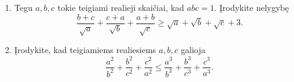 \begin{enumerate}
  \item {} Tegu $a, b,
    c$ tokie teigiami realieji skaičiai, kad $abc=1$. Įrodykite nelygybę
    $$\frac{b+c}{\sqrt{a}}+\frac{c+a}{\sqrt{b}}+\frac{a+b}{\sqrt{c}}\geq\sqrt{a}+\sqrt{b}+\sqrt{c}+3.$$
  \item Įrodykite, kad teigiamiems realiesiems $a,b,c$ galioja
    $$\frac{a^2}{b^2}+\frac{b^2}{c^2}+\frac{c^2}{a^2}\leq\frac{a^3}{b^3}+\frac{b^3}{c^3}+\frac{c^3}{a^3}.$$

\end{enumerate}
